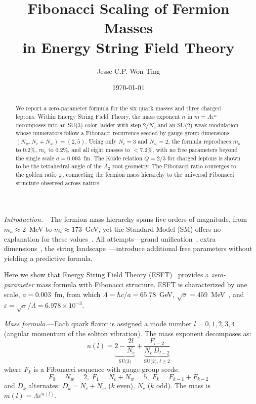 ﻿\documentclass[twocolumn,showpacs,preprintnumbers,amsmath,amssymb,prl]{revtex4-2}
\begin{document}
\title{Fibonacci Scaling of Fermion Masses\\in Energy String Field Theory}

\author{Jesse C.P. Won Ting}

\date{\today}

\begin{abstract}
We report a zero-parameter formula for the six quark masses and three charged leptons. Within Energy String Field Theory, the mass exponent $n$ in $m = \Lambda\varepsilon^n$ decomposes into an SU(3) color ladder with step $2/N_c$ and an SU(2) weak modulation whose numerators follow a Fibonacci recurrence seeded by gauge group dimensions $(N_w, N_c{+}N_w) = (2,5)$. Using only $N_c=3$ and $N_w=2$, the formula reproduces $m_b$ to 0.2\%, $m_e$ to 0.2\%, and all eight masses to $<$7.2\%, with no free parameters beyond the single scale $a = 0.003$~fm. The Koide relation $Q=2/3$ for charged leptons is shown to be the tetrahedral angle of the $A_2$ root geometry. The Fibonacci ratio converges to the golden ratio $\varphi$, connecting the fermion mass hierarchy to the universal Fibonacci structure observed across nature.
\end{abstract}

\maketitle

\emph{Introduction.}---The fermion mass hierarchy spans five orders of magnitude, from $m_u \approx 2$~MeV to $m_t \approx 173$~GeV, yet the Standard Model (SM) offers no explanation for these values~\cite{PDG2024}. All attempts---grand unification~\cite{Georgi1974}, extra dimensions~\cite{Randall1999}, the string landscape~\cite{Susskind2003}---introduce additional free parameters without yielding a predictive formula.

Here we show that Energy String Field Theory (ESFT)~\cite{Paper1,Paper2,Paper3} provides a \emph{zero-parameter} mass formula with Fibonacci structure. ESFT is characterized by one scale, $a = 0.003$~fm, from which $\Lambda = \hbar c/a = 65.78$~GeV, $\sqrt{\sigma} = 459$~MeV~\cite{Paper2}, and $\varepsilon = \sqrt{\sigma}/\Lambda = 6.978 \times 10^{-3}$.

\emph{Mass formula.}---Each quark flavor is assigned a mode number $l = 0,1,2,3,4$ (angular momentum of the soliton vibration). The mass exponent decomposes as:
\begin{equation}
n(l) = \underbrace{2 - \frac{2l}{N_c}}_{\text{SU(3)}} + \underbrace{\frac{F_{l-2}}{N_c \, D_{l-2}}}_{\text{SU(2), }l\geq 2}
\label{eq:master}
\end{equation}
where $F_k$ is a Fibonacci sequence with gauge-group seeds:
\begin{equation}
F_0 = N_w = 2,\; F_1 = N_c{+}N_w = 5,\; F_k = F_{k-1}{+}F_{k-2}
\label{eq:fib}
\end{equation}
and $D_k$ alternates: $D_k = N_c{+}N_w$ ($k$ even), $N_c$ ($k$ odd). The mass is $m(l) = \Lambda\varepsilon^{n(l)}$.
\end{document}
